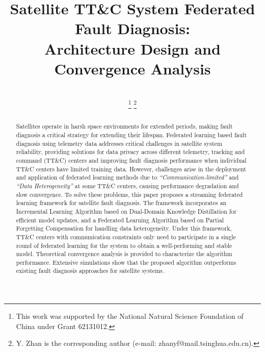 \documentclass[journal]{IEEEtran}
\theoremstyle{plain}
\theoremstyle{definition}
\begin{document}
\title{Satellite TT\&C System Federated Fault Diagnosis:\\Architecture Design and Convergence Analysis}

\author{ \\
\thanks{This work was supported by the National Natural Science Foundation of China under Grant 62131012.}
\thanks{Y. Zhan is the corresponding author (e-mail: zhanyf@mail.tsinghua.edu.cn).}}

\maketitle

\begin{abstract}
Satellites operate in harsh space environments for extended periods, 
making fault diagnosis a critical strategy for extending their lifespan. 
Federated learning based fault diagnosis using telemetry data addresses critical challenges in satellite system reliability, 
providing solutions for data privacy across different telemetry, tracking and command (TT\&C) centers 
and improving fault diagnosis performance when individual TT\&C centers have limited training data. 
However, challenges arise in the deployment and application of federated learning methods
due to \textit{``Communication-limited''} and \textit{``Data Heterogeneity''} at some TT\&C centers, 
causing performance degradation and slow convergence.
To solve these problems, this paper proposes a streaming federated learning framework for satellite fault diagnosis. 
The framework incorporates an Incremental Learning Algorithm based on Dual-Domain Knowledge Distillation for efficient model updates, 
and a Federated Learning Algorithm based on Partial Forgetting Compensation for handling data heterogeneity. 
Under this framework, TT\&C centers with communication constraints only need to participate in a single round of federated learning 
for the system to obtain a well-performing and stable model. 
Theoretical convergence analysis is provided to characterize the algorithm performance. 
Extensive simulations show that the proposed algorithm outperforms existing fault diagnosis approaches for satellite systems.


\end{abstract}
\end{document}
